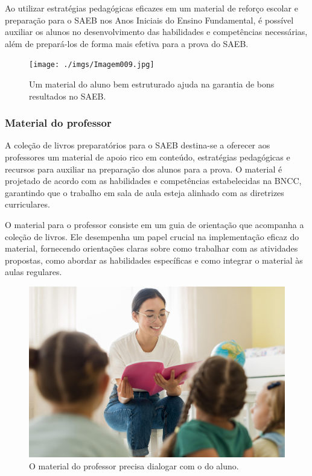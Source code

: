 Ao utilizar estratégias pedagógicas eficazes em um material de reforço
escolar e preparação para o SAEB nos Anos Iniciais do Ensino
Fundamental, é possível auxiliar os alunos no desenvolvimento das
habilidades e competências necessárias, além de prepará-los de forma
mais efetiva para a prova do SAEB.

\begin{figure}
\centering
\texttt{[image: ./imgs/Imagem009.jpg]}
\caption{Um material do aluno bem estruturado ajuda na garantia de bons
resultados no SAEB.}
\end{figure}

\subsubsection{Material do professor}\label{material-do-professor}

A coleção de livros preparatórios para o SAEB destina-se a oferecer aos
professores um material de apoio rico em conteúdo, estratégias
pedagógicas e recursos para auxiliar na preparação dos alunos para a
prova. O material é projetado de acordo com as habilidades e
competências estabelecidas na BNCC, garantindo que o trabalho em sala de
aula esteja alinhado com as diretrizes curriculares.

O material para o professor consiste em um guia de orientação que
acompanha a coleção de livros. Ele desempenha um papel crucial na
implementação eficaz do material, fornecendo orientações claras sobre
como trabalhar com as atividades propostas, como abordar as habilidades
específicas e como integrar o material às aulas regulares.

\begin{figure}
\centering
\includegraphics[width=\textwidth]{./imgs/Imagem010.jpg}
\caption{O material do professor precisa dialogar com o do aluno.}
\end{figure}

